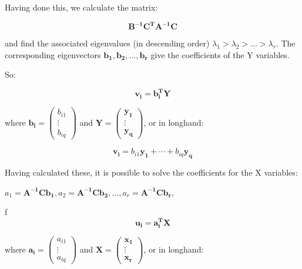 Having done this, we calculate the matrix:

\begin{displaymath}
\boldsymbol{B^{-1}C^{T}A^{-1}C}
\end{displaymath}

and find the associated eigenvalues (in descending order)  $\lambda_{1} > \lambda_{2} > \ldots > \lambda_{r}$.   The corresponding eigenvectors $\boldsymbol{b_{1}}, \boldsymbol{b_{2}}, \ldots, \boldsymbol{b_{r}}$ give the coefficients of the Y variables.

So: 

\begin{displaymath}
\boldsymbol{v_{i}} = \boldsymbol{b_{i}^{T}} \boldsymbol{Y}
\end{displaymath}

where $\boldsymbol{b_{i}} = \left(\begin{array}{c} b_{i1} \\ \vdots \\ b_{iq} \end{array} \right)$ and $\boldsymbol{Y} = \left(\begin{array}{c} \boldsymbol{y_{1}} \\ \vdots \\ \boldsymbol{y_{q}} \end{array} \right)$, or in longhand:

\begin{displaymath}
\boldsymbol{v_{i}} = b_{i1} \boldsymbol{y_{1}} + \cdots + b_{iq} \boldsymbol{y_{q}}
\end{displaymath}

Having calculated these, it is possible to solve the coefficients for the X variables:

$a_{1} = \boldsymbol{A^{-1} C b_{1}}, a_{2} = \boldsymbol{A^{-1} C b_{2}}, \ldots,  a_{r} = \boldsymbol{A^{-1} C b_{r}}$,

f
\begin{displaymath}
\boldsymbol{u_{i}} = \boldsymbol{a_{i}^{T}} \boldsymbol{X}
\end{displaymath}


where $\boldsymbol{a_{i}} = \left(\begin{array}{c} a_{i1} \\ \vdots \\ a_{iq} \end{array} \right)$ and $\boldsymbol{X} = \left(\begin{array}{c} \boldsymbol{x_{1}} \\ \vdots \\ \boldsymbol{x_{r}} \end{array} \right)$, or in longhand:


